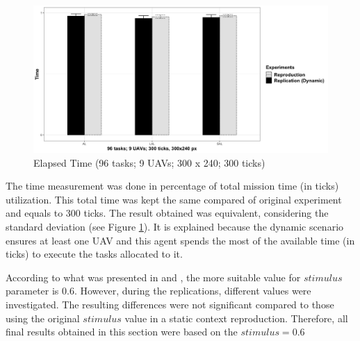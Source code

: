 \begin{figure}[h!]
	\begin{center}
		\includegraphics[scale=0.15]{fig/GRAPH05.png}
		\caption{Elapsed Time (96 tasks; 9 UAVs; 300 x 240; 300 ticks)}
		\label{fig:time}
	\end{center}
\end{figure}

The time measurement was done in percentage of total mission time (in ticks) utilization. This total time was kept the same compared of original experiment and equals to 300 ticks. The result obtained was equivalent, considering the standard deviation (see Figure \ref{fig:time}). It is explained because the dynamic scenario ensures at least one UAV and this agent spends the most of the available time (in ticks) to execute the tasks allocated to it.

According to what was presented in \cite{MAS07} and \cite{ferreira2007swarm}, the more suitable value for $stimulus$ parameter is $0.6$. However, during the replications, different values were investigated. The resulting differences were not significant compared to those using the original $stimulus$ value in a static context reproduction. Therefore, all final results obtained in this section were based on the $stimulus = 0.6$